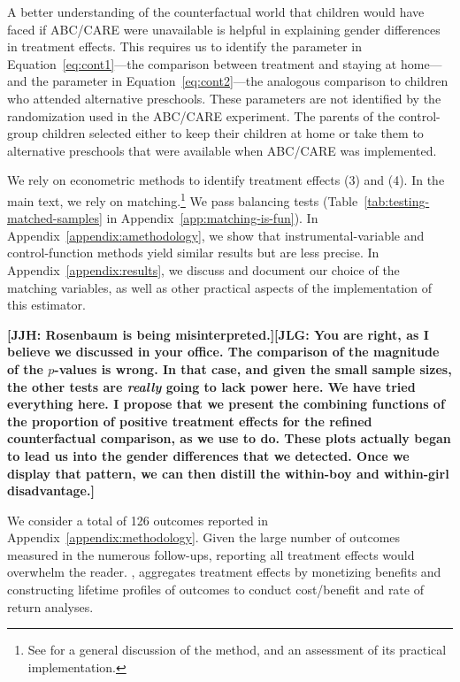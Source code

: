 
A better understanding of the counterfactual world that children would have faced if ABC/CARE were unavailable is helpful in explaining gender differences in treatment effects. This requires us to identify the parameter in Equation~\eqref{eq:cont1}---the comparison between treatment and staying at home---and the parameter in Equation~\eqref{eq:cont2}---the analogous comparison to children who attended alternative preschools. These parameters are not identified by the randomization used in the ABC/CARE experiment. The parents of the control-group children selected either to keep their children at home or take them to alternative preschools that were available when ABC/CARE was implemented.

We rely on econometric methods to identify treatment effects (3) and (4). In the main text, we rely on matching.\footnote{See \citet{Heckman_Ichimura_etal_1998_REStud} for a general discussion of the method, and an assessment of its practical implementation.} We pass balancing tests (Table~\ref{tab:testing-matched-samples} in Appendix~\ref{app:matching-is-fun}). In Appendix~\ref{appendix:amethodology}, we show that instrumental-variable and control-function methods yield similar results but are less precise. In Appendix~\ref{appendix:results}, we discuss and document our choice of the matching variables, as well as other practical aspects of the implementation of this estimator.

\textbf{[JJH: Rosenbaum is being misinterpreted.][JLG: You are right, as I believe we discussed in your office. The comparison of the magnitude of the $p$-values is wrong. In that case, and given the small sample sizes, the other tests are \textit{really} going to lack power here. We have tried everything here. I propose that we present the combining functions of the proportion of positive treatment effects for the refined counterfactual comparison, as we use to do. These plots actually began to lead us into the gender differences that we detected. Once we display that pattern, we can then distill the within-boy and within-girl disadvantage.]}


We consider a total of 126 outcomes reported in Appendix~\ref{appendix:methodology}. Given the large number of outcomes measured in the numerous follow-ups, reporting all treatment effects would overwhelm the reader. \citet{Garcia_Heckman_Leaf_etal_2017_Comp_CBA_Unpublished}, aggregates treatment effects by monetizing benefits and constructing lifetime profiles of outcomes to conduct cost/benefit and rate of return analyses. 

